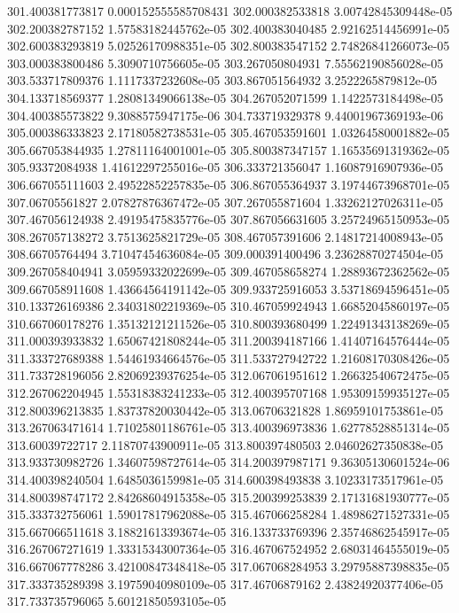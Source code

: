 {301.400381773817 0.000152555585708431
302.000382533818 3.00742845309448e-05
302.200382787152 1.57583182445762e-05
302.400383040485 2.92162514456991e-05
302.600383293819 5.02526170988351e-05
302.800383547152 2.74826841266073e-05
303.000383800486 5.3090710756605e-05
303.267050804931 7.55562190856028e-05
303.533717809376 1.1117337232608e-05
303.867051564932 3.2522265879812e-05
304.133718569377 1.28081349066138e-05
304.267052071599 1.1422573184498e-05
304.400385573822 9.3088575947175e-06
304.733719329378 9.44001967369193e-06
305.000386333823 2.17180582738531e-05
305.467053591601 1.03264580001882e-05
305.667053844935 1.27811164001001e-05
305.800387347157 1.16535691319362e-05
305.93372084938 1.41612297255016e-05
306.333721356047 1.16087916907936e-05
306.667055111603 2.49522852257835e-05
306.867055364937 3.19744673968701e-05
307.06705561827 2.07827876367472e-05
307.267055871604 1.33262127026311e-05
307.467056124938 2.49195475835776e-05
307.867056631605 3.25724965150953e-05
308.267057138272 3.7513625821729e-05
308.467057391606 2.14817214008943e-05
308.66705764494 3.71047454636084e-05
309.000391400496 3.23628870274504e-05
309.267058404941 3.05959332022699e-05
309.467058658274 1.28893672362562e-05
309.667058911608 1.43664564191142e-05
309.933725916053 3.53718694596451e-05
310.133726169386 2.34031802219369e-05
310.467059924943 1.66852045860197e-05
310.667060178276 1.35132121211526e-05
310.800393680499 1.22491343138269e-05
311.000393933832 1.65067421808244e-05
311.200394187166 1.41407164576444e-05
311.333727689388 1.54461934664576e-05
311.533727942722 1.21608170308426e-05
311.733728196056 2.82069239376254e-05
312.067061951612 1.26632540672475e-05
312.267062204945 1.55318383241233e-05
312.400395707168 1.95309159935127e-05
312.800396213835 1.83737820030442e-05
313.06706321828 1.86959101753861e-05
313.267063471614 1.71025801186761e-05
313.400396973836 1.62778528851314e-05
313.60039722717 2.11870743900911e-05
313.800397480503 2.04602627350838e-05
313.933730982726 1.34607598727614e-05
314.200397987171 9.36305130601524e-06
314.400398240504 1.6485036159981e-05
314.600398493838 3.10233173517961e-05
314.800398747172 2.84268604915358e-05
315.200399253839 2.17131681930777e-05
315.333732756061 1.59017817962088e-05
315.467066258284 1.48986271527331e-05
315.667066511618 3.18821613393674e-05
316.133733769396 2.35746862545917e-05
316.267067271619 1.33315343007364e-05
316.467067524952 2.68031464555019e-05
316.667067778286 3.42100847348418e-05
317.067068284953 3.29795887398835e-05
317.333735289398 3.19759040980109e-05
317.46706879162 2.43824920377406e-05
317.733735796065 5.60121850593105e-05
}
